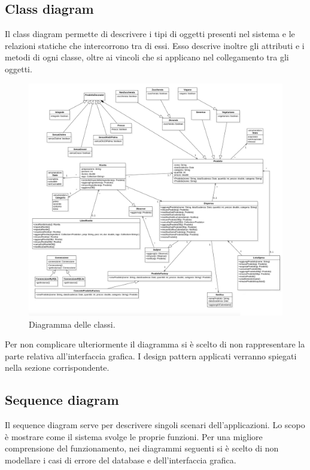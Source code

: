 \documentclass{article}
\begin{document}
\subsection{Class diagram}

Il class diagram permette di descrivere i tipi di oggetti presenti nel sistema e le relazioni statiche che intercorrono tra di essi. Esso descrive inoltre gli attributi e i metodi di ogni classe, oltre ai vincoli che si applicano nel collegamento tra gli oggetti.

\begin{figure}[H]
    \includegraphics[width=\linewidth]{images/class.jpeg}
    \caption{Diagramma delle classi.}
    \label{fig:classdiagram}
\end{figure}

Per non complicare ulteriormente il diagramma si è scelto di non rappresentare la parte relativa all'interfaccia grafica. I design pattern applicati verranno spiegati nella sezione corrispondente.

\subsection{Sequence diagram}

Il sequence diagram serve per descrivere singoli scenari dell'applicazioni. Lo scopo è mostrare come il sistema svolge le proprie funzioni. Per una migliore comprensione del funzionamento, nei diagrammi seguenti si è scelto di non modellare i casi di errore del database e dell'interfaccia grafica. 
\end{document}
